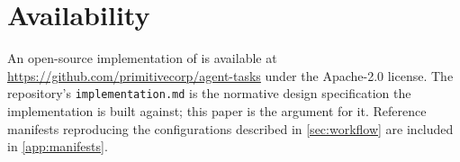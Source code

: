 \section*{Availability}

An open-source implementation of \sysname is available at
\url{https://github.com/primitivecorp/agent-tasks} under the Apache-2.0
license. The repository's \texttt{implementation.md} is the normative design
specification the implementation is built against; this paper is the argument
for it. Reference manifests reproducing the configurations described in
\cref{sec:workflow} are included in \cref{app:manifests}.

